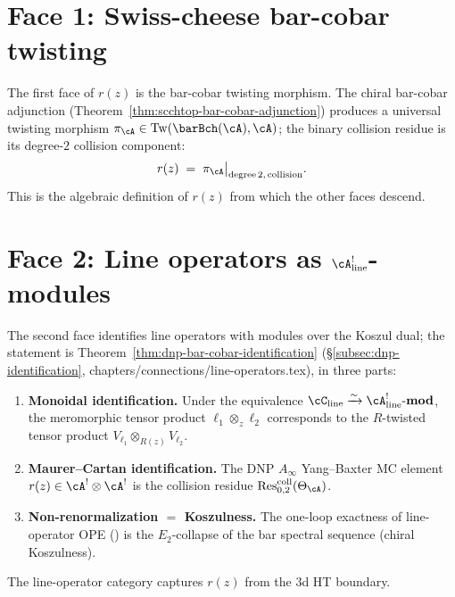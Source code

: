 \section{Face 1: Swiss-cheese bar-cobar twisting}
\label{sec:face-1-bar-cobar}

The first face of $r(z)$ is the bar-cobar twisting morphism. The
chiral bar-cobar adjunction
(Theorem~\ref{thm:scchtop-bar-cobar-adjunction}) produces a
universal twisting morphism
$\pi_\cA \in \mathrm{Tw}(\barBch(\cA), \cA)$; the binary collision
residue is its degree-$2$ collision component:
\[
r(z)
\;=\;
\pi_\cA\big|_{\mathrm{degree}\,2,\,\mathrm{collision}}.
\]
This is the algebraic definition of $r(z)$ from which the other
faces descend.

\section{Face 2: Line operators as $\cA^!_{\mathrm{line}}$-modules}
\label{sec:face-2-line-operators}

The second face identifies line operators with modules over the
Koszul dual; the statement is
Theorem~\ref{thm:dnp-bar-cobar-identification}
(\S\ref{subsec:dnp-identification},
chapters/connections/line-operators.tex), in three parts:

\begin{enumerate}[label=\textup{(\roman*)}]
\item \textbf{Monoidal identification.} Under the equivalence
 $\cC_{\mathrm{line}} \xrightarrow{\sim}
 \cA^!_{\mathrm{line}}\text{-}\mathbf{mod}$, the meromorphic tensor
 product $\ell_1 \otimes_z \ell_2$ corresponds to the $R$-twisted
 tensor product $V_{\ell_1} \otimes_{R(z)} V_{\ell_2}$.
\item \textbf{Maurer--Cartan identification.} The DNP $A_\infty$
 Yang--Baxter MC element $r(z) \in \cA^! \otimes \cA^!$ is the
 collision residue $\operatorname{Res}^{\mathrm{coll}}_{0,2}(\Theta_\cA)$.
\item \textbf{Non-renormalization $=$ Koszulness.} The one-loop
 exactness of line-operator OPE \textup{(\cite[Thm.\,4.1]{DNP25})} is
 the $E_2$-collapse of the bar spectral sequence (chiral Koszulness).
\end{enumerate}

The line-operator category captures $r(z)$ from the 3d HT
boundary.

